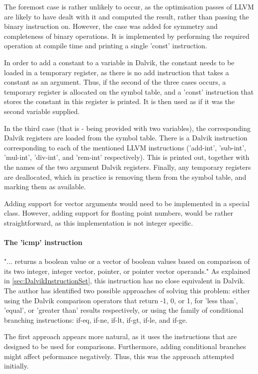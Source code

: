 \documentclass[parskip]{cs4rep}
\begin{document}
The foremost case is rather unlikely to occur, as the optimisation passes of LLVM are likely to have dealt with it and computed the result, rather than passing the binary instruction on. However, the case was added for symmetry and completeness of binary operations. It is implemented by performing the required operation at compile time and printing a single 'const' instruction.

In order to add a constant to a variable in Dalvik, the constant needs to be loaded in a temporary register, as there is no add instruction that takes a constant as an argument. Thus, if the second of the three cases occurs, a temporary register is allocated on the symbol table, and a 'const' instruction that stores the constant in this register is printed. It is then used as if it was the second variable supplied.

In the third case (that is - being provided with two variables), the corresponding Dalvik registers are loaded from the symbol table. There is a Dalvik instruction corresponding to each of the mentioned LLVM instructions ('add-int', 'sub-int', 'mul-int', 'div-int', and 'rem-int' respectively). This is printed out, together with the names of the two argument Dalvik registers. Finally, any temporary registers are deallocated, which in practice is removing them from the symbol table, and marking them as available.

Adding support for vector arguments would need to be implemented in a special class. However, adding support for floating point numbers, would be rather straightforward, as this implementation is not integer specific.

\paragraph{The 'icmp' instruction} "... returns a boolean value or a vector of boolean values based on comparison of its two integer, integer vector, pointer, or pointer vector operands."\cite{P11} As explained in \ref{sec:DalvikInstructionSet}, this instruction has no close equivalent in Dalvik. The author has identified two possible approaches of solving this problem: either using the Dalvik comparison operators that return -1, 0, or 1, for 'less than', 'equal', or 'greater than' results respectively, or using the family of conditional branching instructions: if-eq, if-ne, if-lt, if-gt, if-le, and if-ge.

The first approach appears more natural, as it uses the instructions that are designed to be used for comparisons. Furthermore, adding conditional branches might affect peformance negatively. Thus, this was the approach attempted initially.
\end{document}
